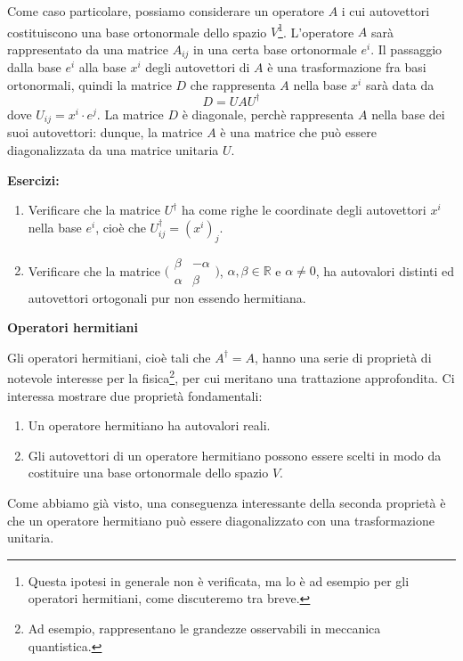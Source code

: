 \documentclass[a4paper,10pt]{article}
\newcommand{\linea}{\vskip14pt \noindent}
\begin{document}
\linea
Come caso particolare, possiamo considerare un operatore $A$ i cui autovettori costituiscono
una base ortonormale dello spazio $V$\footnote{Questa ipotesi in generale non \`e verificata,
ma lo \`e ad esempio per gli operatori hermitiani, come discuteremo tra breve.}. 
L'operatore $A$ sar\`a rappresentato da una matrice $A_{ij}$ in una certa base ortonormale $e^i$.
Il passaggio dalla base $e^i$ alla base $x^i$ degli autovettori di $A$ \`e una trasformazione fra
basi ortonormali, quindi la matrice $D$ che rappresenta $A$ nella base $x^i$ sar\`a data da
\begin{equation}
D = U A U^\dag
\end{equation}
dove $U_{ij}=x^i \cdot e^j$. La matrice $D$ \`e diagonale, perch\`e rappresenta $A$ nella base dei
suoi autovettori: dunque, la matrice $A$ \`e una matrice che pu\`o essere diagonalizzata da una
matrice unitaria $U$. 

\linea
{\bf Esercizi:}
\begin{enumerate}
\item Verificare che la matrice $U^\dag$ ha come righe le coordinate degli autovettori $x^i$
nella base $e^i$, cio\`e che $U^\dag_{ij}=(x^i)_j$.
\item Verificare che la matrice $\bigl( \begin{smallmatrix} \beta & -\alpha \\ \alpha & \beta \end{smallmatrix}
\bigr)$, $\alpha,\beta \in \mathbb{R}$ e $\alpha \neq 0$, ha autovalori distinti ed autovettori ortogonali pur non essendo hermitiana.
\end{enumerate}

\newpage

\centerline {\bf Operatori hermitiani}

\linea
Gli operatori hermitiani, cio\`e tali che $A^\dag=A$, hanno una serie di propriet\`a di notevole
interesse per la  
fisica\footnote{Ad esempio, rappresentano le grandezze osservabili in meccanica quantistica.},
per cui meritano una trattazione approfondita. 
Ci interessa mostrare due propriet\`a fondamentali:
\begin{enumerate}
\item Un operatore hermitiano ha autovalori reali.
\item Gli autovettori di un operatore hermitiano possono essere scelti in modo da costituire una base
ortonormale dello spazio $V$.
\end{enumerate}
Come abbiamo gi\`a visto, una conseguenza interessante della seconda propriet\`a \`e 
che un operatore hermitiano pu\`o essere diagonalizzato con una trasformazione unitaria.
\end{document}
